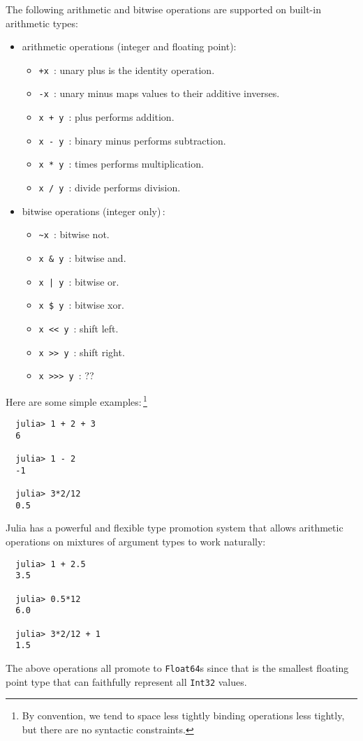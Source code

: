 \documentclass{article}
\begin{document}
The following arithmetic and bitwise operations are supported on built-in arithmetic types:
\begin{itemize}
  \item arithmetic operations (integer and floating point):
  \begin{itemize}
    \item \verb|+x|~: unary plus is the identity operation.
    \item \verb|-x|~: unary minus maps values to their additive inverses.
    \item \verb|x + y|~: plus performs addition.
    \item \verb|x - y|~: binary minus performs subtraction.
    \item \verb|x * y|~: times performs multiplication.
    \item \verb|x / y|~: divide performs division.
  \end{itemize}
  \item bitwise operations (integer only)\,:
  \begin{itemize}
    \item \verb|~x|~: bitwise not.
    \item \verb|x & y|~: bitwise and.
    \item \texttt{x | y}~: bitwise or.
    \item \verb|x $ y|~: bitwise xor.
    \item \verb|x << y|~: shift left.
    \item \verb|x >> y|~: shift right.
    \item \verb|x >>> y|~: ??
  \end{itemize}
\end{itemize}
Here are some simple examples:\,\footnote{By convention, we tend to space less tightly binding operations less tightly, but there are no syntactic constraints.}
\begin{verbatim}
  julia> 1 + 2 + 3
  6

  julia> 1 - 2
  -1

  julia> 3*2/12
  0.5
\end{verbatim}
Julia has a powerful and flexible type promotion system that allows arithmetic operations on mixtures of argument types to work naturally:
\begin{verbatim}
  julia> 1 + 2.5
  3.5

  julia> 0.5*12
  6.0

  julia> 3*2/12 + 1
  1.5
\end{verbatim}
The above operations all promote to \verb|Float64|s since that is the smallest floating point type that can faithfully represent all \verb|Int32| values.
\end{document}
